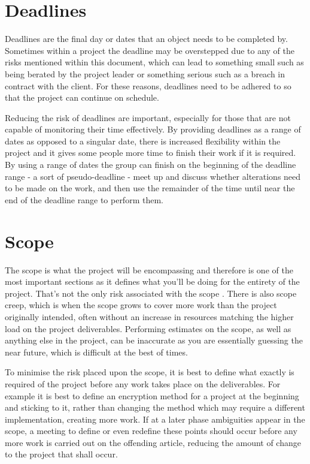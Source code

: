 \section{Deadlines}
Deadlines are the final day or dates that an object needs to be completed by.
Sometimes within a project the deadline may be overstepped due to any of the
risks mentioned within this document, which can lead to something small such as
being berated by the project leader or something serious such as a breach in
contract with the client. For these reasons, deadlines need to be adhered to
so that the project can continue on schedule.

Reducing the risk of deadlines are important, especially for those that are not
capable of monitoring their time effectively. By providing deadlines as a range
of dates as opposed to a singular date, there is increased flexibility within
the project and it gives some people more time to finish their work if it is
required. By using a range of dates the group can finish on the beginning of
the deadline range - a sort of pseudo-deadline - meet up and discuss whether
alterations need to be made on the work, and then use the remainder of the time
until near the end of the deadline range to perform them.

\section{Scope}
The scope is what the project will be encompassing and therefore is one of the
most important sections as it defines what you'll be doing for the entirety of
the project. That's not the only risk associated with the scope 
\cite{RiskList}.
There is also scope creep, which is when the scope grows to cover more work than
the project originally intended, often without an increase in resources matching
the higher load on the project deliverables. Performing estimates on the scope,
as well as anything else in the project, can be inaccurate as you are
essentially guessing the near future, which is difficult at the best of times.

To minimise the risk placed upon the scope, it is best to define what exactly is
required of the project before any work takes place on the deliverables.  For
example it is best to define an encryption method for a project at the beginning
and sticking to it, rather than changing the method which may require a different
implementation, creating more work. If at a later phase ambiguities appear in
the scope, a meeting to define or even redefine these points should occur before
any more work is carried out on the offending article, reducing the amount of
change to the project that shall occur.

